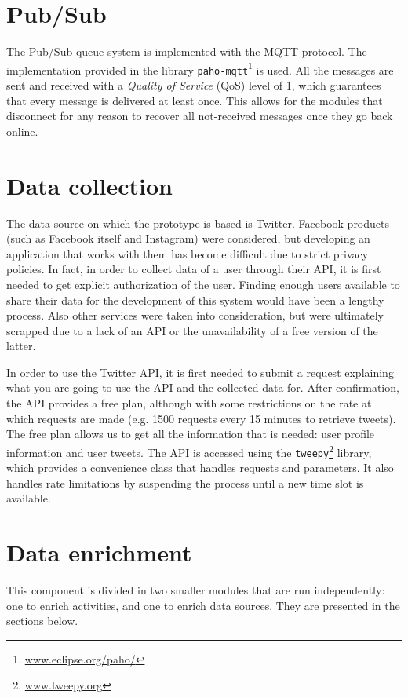 \section{Pub/Sub}
The Pub/Sub queue system is implemented with the MQTT protocol. The implementation provided in the library \texttt{paho-mqtt}\footnote{\url{www.eclipse.org/paho/}} is used. All the messages are sent and received with a \emph{Quality of Service} (QoS) level of 1, which guarantees that every message is delivered at least once. This allows for the modules that disconnect for any reason to recover all not-received messages once they go back online.

\section{Data collection}
\label{sec:data_collection_imp}
The data source on which the prototype is based is Twitter. Facebook products (such as Facebook itself and Instagram) were considered, but developing an application that works with them has become difficult due to strict privacy policies. In fact, in order to collect data of a user through their API, it is first needed to get explicit authorization of the user. Finding enough users available to share their data for the development of this system would have been a lengthy process. Also other services were taken into consideration, but were ultimately scrapped due to a lack of an API or the unavailability of a free version of the latter.

In order to use the Twitter API, it is first needed to submit a request explaining what you are going to use the API and the collected data for. After confirmation, the API provides a free plan, although with some restrictions on the rate at which requests are made (e.g. 1500 requests every 15 minutes to retrieve tweets). The free plan allows us to get all the information that is needed: user profile information and user tweets. The API is accessed using the \texttt{tweepy}\footnote{\url{www.tweepy.org}} library, which provides a convenience class that handles requests and parameters. It also handles rate limitations by suspending the process until a new time slot is available.

\section{Data enrichment}
This component is divided in two smaller modules that are run independently: one to enrich activities, and one to enrich data sources. They are presented in the sections below.

